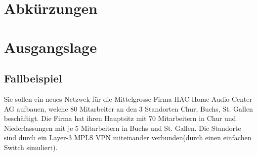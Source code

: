 \documentclass[12pt,a4paper,titlepage]{article}
\begin{document}
\pagebreak

\tableofcontents 
\pagebreak

\listoffigures


\listoftables 
\newpage


\section{Abkürzungen}
\begin{acronym}[Bash]
\end{acronym}
\newpage


\section{Ausgangslage} 
\subsection{Fallbeispiel}
Sie sollen ein neues Netzwek für die Mittelgrosse Firma HAC Home Audio Center AG aufbauen, welche 80 Mitarbeiter an den 3 Standorten Chur, Buchs, St. Gallen beschäftigt. Die Firma hat ihren Hauptsitz mit 70 Mitarbeitern in Chur und Niederlassungen mit je 5 Mitarbeitern in Buchs und St. Gallen. Die Standorte sind durch ein Layer-3 MPLS VPN miteinander verbunden(durch einen einfachen Switch simuliert).
\newpage
\end{document}

